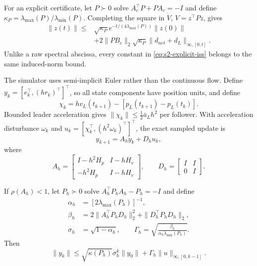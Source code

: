 For an explicit certificate, let $P\succ0$ solve
$A_c^\top P+PA_c=-I$ and define
$\kappa_P=\lambda_{\max}(P)/\lambda_{\min}(P)$.  Completing the square in
$\dot V$, $V=z^\top Pz$, gives
\begin{equation}
\begin{split}
\|z(t)\|\le{}&\sqrt{\kappa_P}
e^{-t/(4\lambda_{\max}(P))}\|z(0)\|\\
&+2\|PB_c\|_2\sqrt{\kappa_P}
\|d_{net}+d_L\|_{\infty,[0,t]}.
\end{split}
\label{eq:s2-explicit-iss}
\end{equation}
Unlike a raw spectral abscissa, every constant in
\eqref{eq:s2-explicit-iss} belongs to the same induced-norm bound.

The simulator uses semi-implicit Euler rather than the continuous flow.  Define
$y_k=[e_k^\top,(h r_k)^\top]^\top$, so all state components have position
units, and define
\begin{equation}
\chi_k=h v_L(t_{k+1})-[p_L(t_{k+1})-p_L(t_k)].
\end{equation}
Bounded leader acceleration gives
$\|\chi_k\|\le\tfrac12\bar a_Lh^2$ per follower.  With acceleration
disturbance $\omega_k$ and
$u_k=[\chi_k^\top,(h^2\omega_k)^\top]^\top$, the exact sampled update is
\begin{equation}
y_{k+1}=A_hy_k+D_hu_k,
\label{eq:s2-sampled-system}
\end{equation}
where
\begin{equation}
A_h=\begin{bmatrix}
I-h^2H_p&I-hH_v\\
-h^2H_p&I-hH_v
\end{bmatrix},\qquad
D_h=\begin{bmatrix}I&I\\0&I\end{bmatrix}.
\end{equation}

\begin{theorem}
If $\rho(A_h)<1$, let $P_h\succ0$ solve
$A_h^\top P_hA_h-P_h=-I$ and define
\begin{align}
\alpha_h&=[2\lambda_{\max}(P_h)]^{-1},\\
\beta_h&=2\|A_h^\top P_hD_h\|_2^2+
\|D_h^\top P_hD_h\|_2,\\
\sigma_h&=\sqrt{1-\alpha_h},\qquad
\Gamma_h=\sqrt{\frac{\beta_h}
{\alpha_h\lambda_{\min}(P_h)}}.
\end{align}
Then
\begin{equation}
\|y_k\|\le\sqrt{\kappa(P_h)}\sigma_h^k\|y_0\|
+\Gamma_h\|u\|_{\infty,[0,k-1]}.
\label{eq:s2-sampled-iss}
\end{equation}
\label{thm:s2-sampled-iss}
\end{theorem}

